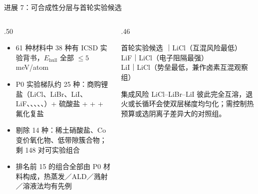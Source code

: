 \documentclass[aspectratio=169,10pt]{beamer}
\begin{document}
\begin{frame}[t]{进展 7：可合成性分层与首轮实验候选}
\begin{columns}[T,onlytextwidth]
  \begin{column}{.50\textwidth}
    \begin{itemize}
      \item 61 种材料中 38 种有 ICSD 实验背书，$E_\mathrm{hull}$ 全部 $\le5$\,meV/atom
      \item \alert{P0 实验梯队约 25 种}：商购锂盐（LiCl、LiBr、LiI、LiF、、、、、）+ 硫酸盐 +  +  + 氟化复盐
      \item 剔除 14 种：稀土硝酸盐、Co 变价氧化物、低带隙簇合物；剩 148 对可实验组合
      \item 排名前 15 的组合全部由 P0 材料构成，热蒸发／ALD／溅射／溶液法均有先例
    \end{itemize}
  \end{column}
  \begin{column}{.46\textwidth}
    \begin{njuquotegreen}{首轮实验候选}
      ｜LiCl（互混风险最低）\\
      LiF｜LiCl（电子阻隔最强）\\
      LiI｜LiCl（势垒最低，兼作卤素互混观察组）
    \end{njuquotegreen}
    \begin{njuquotered}{集成风险}
      LiCl–LiBr–LiI 彼此完全互溶，退火或长循环会使双层梯度均匀化；需控制热预算或选阴离子差异大的对照组。
    \end{njuquotered}
  \end{column}
\end{columns}
\end{frame}
\end{document}
